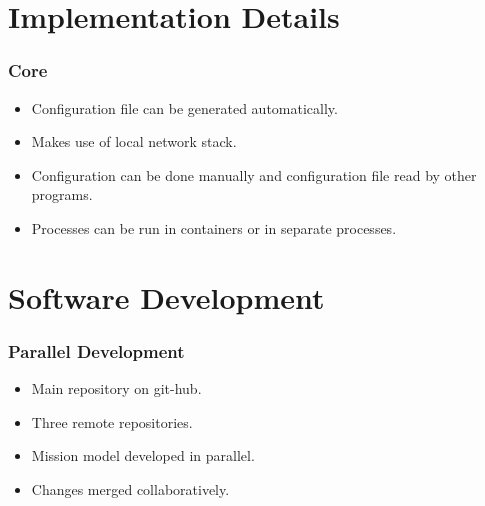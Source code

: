 \documentclass{beamer}
\begin{document}
\section{Implementation Details}

\begin{frame}
  \frametitle{Core}

  \begin{itemize}
  \item Configuration file can be generated automatically.
  \item Makes use of local network stack.
  \item Configuration can be done manually and configuration file read
    by other programs.
  \item Processes can be run in containers or in separate processes.
  \end{itemize}

\end{frame}


\section{Software Development}

\begin{frame}
  \frametitle{Parallel Development}
  
  \begin{itemize}
  \item Main repository on git-hub.
  \item Three remote repositories.
  \item Mission model developed in parallel.
  \item Changes merged collaboratively.
  \end{itemize}

\end{frame}
\end{document}
